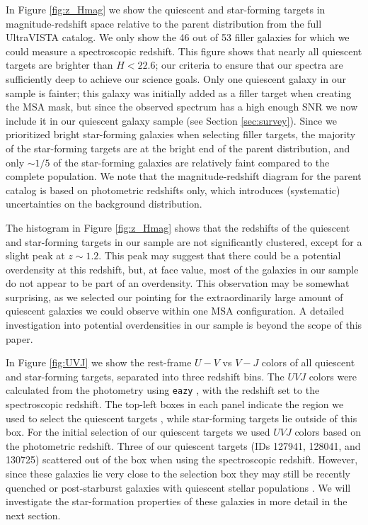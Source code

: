 \documentclass[twocolumn, astrosymb]{aastex631}
\begin{document}
In Figure \ref{fig:z_Hmag} we show the quiescent and star-forming targets in magnitude-redshift space relative to the parent distribution from the full UltraVISTA catalog. We only show the 46 out of 53 filler galaxies for which we could measure a spectroscopic redshift. This figure shows that nearly all quiescent targets are brighter than $H<22.6$; our criteria to ensure that our spectra are sufficiently deep to achieve our science goals. Only one quiescent galaxy in our sample is fainter; this galaxy was initially added as a filler target when creating the MSA mask, but since the observed spectrum has a high enough SNR we now include it in our quiescent galaxy sample (see Section \ref{sec:survey}). Since we prioritized bright star-forming galaxies when selecting filler targets, the majority of the star-forming targets are at the bright end of the parent distribution, and only $\sim 1/5$ of the star-forming galaxies are relatively faint compared to the complete population. We note that the magnitude-redshift diagram for the parent catalog is based on photometric redshifts only, which introduces (systematic) uncertainties on the background distribution.

The histogram in Figure \ref{fig:z_Hmag} shows that the redshifts of the quiescent and star-forming targets in our sample are not significantly clustered, except for a slight peak at $z \sim 1.2$. This peak may suggest that there could be a potential overdensity at this redshift, but, at face value, most of the galaxies in our sample do not appear to be part of an overdensity. This observation may be somewhat surprising, as we selected our pointing for the extraordinarily large amount of quiescent galaxies we could observe within one MSA configuration. A detailed investigation into potential overdensities in our sample is beyond the scope of this paper.

In Figure \ref{fig:UVJ} we show the rest-frame $U-V$ vs $V-J$ colors of all quiescent and star-forming targets, separated into three redshift bins. The $UVJ$ colors were calculated from the photometry using \texttt{eazy} \citep{GBrammer2008}, with the redshift set to the spectroscopic redshift. The top-left boxes in each panel indicate the region we used to select the quiescent targets \citep[red symbols;][]{AMuzzin2013a}, while star-forming targets lie outside of this box. For the initial selection of our quiescent targets we used $UVJ$ colors based on the photometric redshift. Three of our quiescent targets (IDs 127941, 128041, and 130725) scattered out of the box when using the spectroscopic redshift. However, since these galaxies lie very close to the selection box they may still be recently quenched or post-starburst galaxies with quiescent stellar populations \citep[e.g.,][]{SBelli2019, KSuess2021, MPark2023}. We will investigate the star-formation properties of these galaxies in more detail in the next section.
\end{document}

